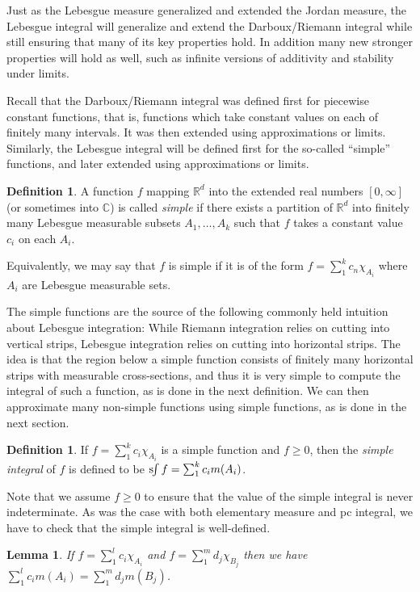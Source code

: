 \documentclass[11pt,oneside]{amsbook}
\newcommand{\RR}{{\mathbb R}}
\newcommand{\CC}{{\mathbb C}}
\newcommand{\sint}{\text{s}\kern-3pt\int}
\theoremstyle{definition}
\theoremstyle{plain}
\newtheorem{lem}[thm]{Lemma}
\theoremstyle{definition}
\newtheorem{defn}[thm]{Definition}
\theoremstyle{remark}
\numberwithin{equation}{section}
\numberwithin{figure}{section}
\begin{document}
Just as the Lebesgue measure generalized and extended the Jordan measure, the Lebesgue integral will generalize and extend the Darboux/Riemann integral while still ensuring that many of its key properties hold. In addition many new stronger properties will hold as well, such as infinite versions of additivity and stability under limits.

Recall that the Darboux/Riemann integral was defined first for piecewise constant functions, that is, functions which take constant values on each of finitely many intervals. It was then extended using approximations or limits. Similarly, the Lebesgue integral will be defined first for the so-called ``simple'' functions, and later extended using approximations or limits.

\begin{defn}
  A function $f$ mapping $\RR^d$ into the extended real numbers $[0,\infty]$ (or sometimes into $\CC$) is called \emph{simple} if there exists a partition of $\RR^d$ into finitely many Lebesgue measurable subsets $A_1,\ldots,A_k$ such that $f$ takes a constant value $c_i$ on each $A_i$.
\end{defn}

Equivalently, we may say that $f$ is simple if it is of the form $f=\sum_1^kc_n\chi_{A_i}$ where $A_i$ are Lebesgue measurable sets.

The simple functions are the source of the following commonly held intuition about Lebesgue integration: While Riemann integration relies on cutting into vertical strips, Lebesgue integration relies on cutting into horizontal strips. The idea is that the region below a simple function consists of finitely many horizontal strips with measurable cross-sections, and thus it is very simple to compute the integral of such a function, as is done in the next definition. We can then approximate many non-simple functions using simple functions, as is done in the next section.

\begin{defn}
  If $f=\sum_1^kc_i\chi_{A_i}$ is a simple function and $f\geq0$, then the \emph{simple integral} of $f$ is defined to be $\sint f=\sum_1^kc_im(A_i)$.
\end{defn}

Note that we assume $f\geq0$ to ensure that the value of the simple integral is never indeterminate. As was the case with both elementary measure and pc integral, we have to check that the simple integral is well-defined.

\begin{lem}
  If $f=\sum_1^lc_i\chi_{A_i}$ and $f=\sum_1^md_j\chi_{B_j}$ then we have $\sum_1^l c_i m(A_i)=\sum_1^m d_j m(B_j)$.
\end{lem}
\end{document}
